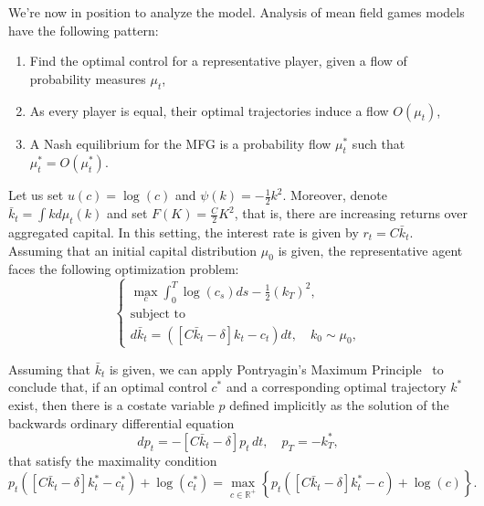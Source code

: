 We're now in position to analyze the model. Analysis of mean field games models have the following pattern:
\begin{enumerate}
    \item Find the optimal control for a representative player, given a flow of probability measures $\mu_t$,
    \item As every player is equal, their optimal trajectories induce a flow $O(\mu_t)$,
    \item A Nash equilibrium for the MFG is a probability flow $\mu_t^*$ such that $\mu_t^* = O(\mu_t^*)$.
\end{enumerate}
 
Let us set $u(c) = \log(c)$ and $\psi(k) = - \frac{1}{2} k^2$.
Moreover, denote $\bar k_t = \int k d \mu_t(k)$ and set $F(K) = \frac{C}{2} K^2$, that is, there are increasing returns over aggregated capital.
In this setting, the interest rate is given by $r_t = C {\bar k_t} $.
Assuming that an initial capital distribution $\mu_0$ is given,
the representative agent faces the following optimization problem:
\begin{equation}\label{economic_example:representative_agent}
    \begin{cases}
        \max_{c} \int_0^T \log(c_s) ds -\frac{1}{2}{(k_T)}^2,\\
        \text{subject to}\\
        d {\bar k}_t = \left(\left[ C {\bar k_t} - \delta \right] k_t - c_t \right) dt, \quad k_0 \sim \mu_0,
    \end{cases}
\end{equation}

Assuming that ${\bar k_t}$ is given, we can apply Pontryagin's Maximum Principle~\cite{bressan2007introduction}
to conclude that, if an optimal control $c^*$ and a corresponding optimal trajectory $k^*$ exist,
then there is a costate variable $p$ defined implicitly as the solution of the backwards ordinary differential equation
\begin{equation}\label{economic_example:costate_ode}
    d p_t = -  \left[C{{\bar k}_t} - \delta \right] p_t\, dt, \quad p_T =  - k^*_T,
\end{equation}
that satisfy the maximality condition
\begin{equation}\label{economic_example:maximality_condition}
    p_t\left( \left[C {\bar k_t} - \delta \right]k^*_t - c^*_t \right) + \log(c^*_t) = 
    \max_{c \in \mathbb{R}^+} \left\{ p_t\left( \left[C {\bar k_t} - \delta \right]k^*_t - c \right) + \log(c) \right\}.
\end{equation}

